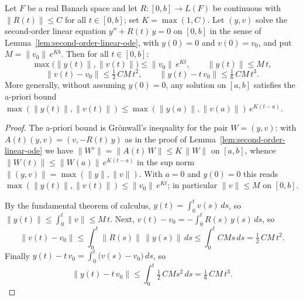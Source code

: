 \begin{lemma}
\label{lem:jacobi-small-time}
\leanok
Let $F$ be a real Banach space and let $R\colon[0,b]\to L(F)$ be
continuous with $\|R(t)\|\le C$ for all $t\in[0,b]$; set
$K=\max(1,C)$. Let $(y,v)$ solve the second-order linear equation
$y''+R(t)\,y=0$ on $[0,b]$ in the sense of
Lemma~\ref{lem:second-order-linear-ode}, with $y(0)=0$ and
$v(0)=v_0$, and put $M=\|v_0\|\,e^{Kb}$. Then for all $t\in[0,b]$:
$$\max\bigl(\|y(t)\|,\|v(t)\|\bigr)\le\|v_0\|\,e^{Kt},\qquad
\|y(t)\|\le M\,t,$$
$$\|v(t)-v_0\|\le\tfrac12\,CM\,t^2,\qquad
\|y(t)-t\,v_0\|\le\tfrac16\,CM\,t^3.$$
More generally, without assuming $y(0)=0$, any solution on $[a,b]$
satisfies the a-priori bound
$\max(\|y(t)\|,\|v(t)\|)\le
\max(\|y(a)\|,\|v(a)\|)\,e^{K(t-a)}$.
\end{lemma}

\begin{proof}
\leanok
The a-priori bound is Gr\"onwall's inequality for the pair
$W=(y,v)$: with $A(t)(y,v)=(v,-R(t)\,y)$ as in the proof of
Lemma~\ref{lem:second-order-linear-ode} we have
$\|W'\|=\|A(t)\,W\|\le K\,\|W\|$ on $[a,b]$, whence
$\|W(t)\|\le\|W(a)\|\,e^{K(t-a)}$ in the sup norm
$\|(y,v)\|=\max(\|y\|,\|v\|)$. With $a=0$ and $y(0)=0$ this reads
$\max(\|y(t)\|,\|v(t)\|)\le\|v_0\|\,e^{Kt}$; in particular
$\|v\|\le M$ on $[0,b]$.

By the fundamental theorem of calculus,
$y(t)=\int_0^tv(s)\,ds$, so $\|y(t)\|\le\int_0^t\|v\|\le M\,t$.
Next, $v(t)-v_0=-\int_0^tR(s)\,y(s)\,ds$, so
$$\|v(t)-v_0\|\le\int_0^t\|R(s)\|\,\|y(s)\|\,ds
\le\int_0^tCMs\,ds=\tfrac12\,CM\,t^2.$$
Finally $y(t)-t\,v_0=\int_0^t\bigl(v(s)-v_0\bigr)\,ds$, so
$$\|y(t)-t\,v_0\|\le\int_0^t\tfrac12\,CMs^2\,ds
=\tfrac16\,CM\,t^3.$$
\end{proof}

